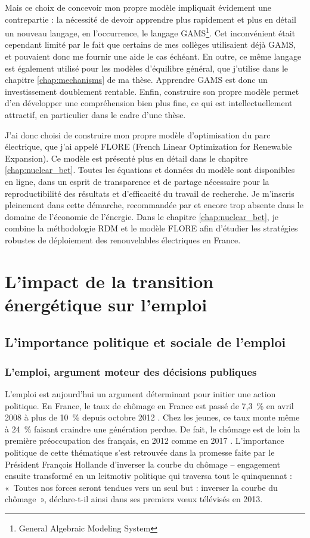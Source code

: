 Mais ce choix de concevoir mon propre modèle impliquait évidement une contrepartie : la nécessité de devoir apprendre plus rapidement et plus en détail un nouveau langage, en l'occurrence, le langage GAMS\footnote{General Algebraic Modeling System}. 
Cet inconvénient était cependant limité par le fait que certains de mes collèges utilisaient déjà GAMS, et pouvaient donc me fournir une aide le cas échéant. 
En outre, ce même langage est également utilisé pour les modèles d'équilibre général, que j'utilise dans le chapitre \ref{chap:mechanisms} de ma thèse. Apprendre GAMS est donc un investissement doublement rentable. 
Enfin, construire son propre modèle permet d'en développer une compréhension bien plus fine, ce qui est intellectuellement attractif, en particulier dans le cadre d'une thèse.

J’ai donc choisi de construire mon propre modèle d’optimisation du parc électrique, que j’ai appelé FLORE (French Linear Optimization for Renewable Expansion). Ce modèle est présenté plus en détail dans le chapitre \ref{chap:nuclear_bet}.
Toutes les équations et données du modèle sont disponibles en ligne, dans un esprit de transparence et de partage nécessaire pour la reproductibilité des résultats et d’efficacité du travail de recherche. Je m’inscris pleinement dans cette démarche, recommandée par \citet{Pfenninger2017} et encore trop absente dans le domaine de l’économie de l’énergie.
Dans le chapitre \ref{chap:nuclear_bet}, je combine la méthodologie RDM et le modèle FLORE afin d’étudier les stratégies robustes de déploiement des renouvelables électriques en France.

\section{L’impact de la transition énergétique sur l’emploi}
\label{sec:intro_emploi}


\subsection{L'importance politique et sociale de l'emploi}

\subsubsection{L'emploi, argument moteur des décisions publiques}

L’emploi est aujourd'hui un argument déterminant pour initier une action politique.
En France, le taux de chômage en France est passé de 7,3~\% en avril 2008 à plus de 10~\% depuis octobre 2012 \citep{Eurostat}. Chez les jeunes, ce taux monte même à 24~\% \citep{OCDE} faisant craindre une génération perdue.
De fait, le chômage est de loin la première préoccupation des français, en 2012 \citep{TNSSOFRES2012} comme en 2017 \citep{IFOP2017}.
L'importance politique de cette thématique s'est retrouvée dans la promesse faite par le Président François Hollande d'inverser la courbe du chômage -- engagement ensuite transformé en un leitmotiv politique qui traversa tout le quinquennat : «~Toutes nos forces seront tendues vers un seul but : inverser la courbe du chômage~», déclare-t-il ainsi dans ses premiers v\oe{}ux télévisés en 2013.

